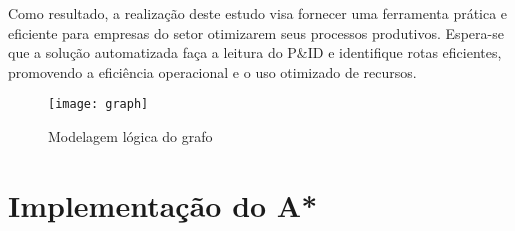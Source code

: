 Como resultado, a realização deste estudo visa fornecer uma ferramenta
prática e eficiente para empresas do setor otimizarem seus processos
produtivos. Espera-se que a solução automatizada faça a leitura do P\&ID
e identifique rotas eficientes, promovendo a eficiência operacional e o
uso otimizado de recursos.

\begin{figure}
\centering
\texttt{[image: graph]}
\caption{Modelagem lógica do grafo}
\end{figure}

\section{Implementação do A*}\label{implementauxe7uxe3o-do-a}

\begin{Shaded}
\begin{Highlighting}[]

     \NormalTok{(}
        \OperatorTok{=}

         

\OperatorTok{=}\NormalTok{(}\NormalTok{) } 
\OperatorTok{=}\NormalTok{(}\NormalTok{) } 
\OperatorTok{=}  
\OperatorTok{=}\NormalTok{ [(}\NormalTok{, start)]}


\end{Highlighting}
\end{Shaded}
